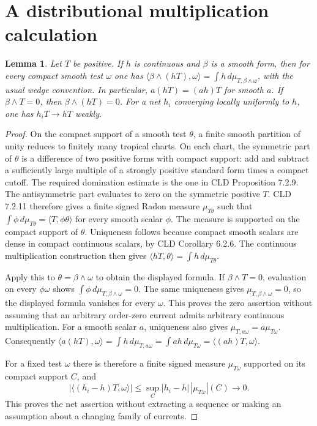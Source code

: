 \documentclass[11pt]{article}
\newtheorem{lemma}[theorem]{Lemma}
\begin{document}
\section{A distributional multiplication calculation}
\begin{lemma}\label{lem:coeff}
Let $T$ be positive. If $h$ is continuous and $\beta$ is a smooth form,
then for every compact smooth test $\omega$ one has
$\langle\beta\wedge(hT),\omega\rangle
=\int h\,d\mu_{T,\beta\wedge\omega}$, with the usual wedge convention.
In particular, $a(hT)=(ah)T$ for smooth $a$. If
$\beta\wedge T=0$, then $\beta\wedge(hT)=0$. For a net $h_i$ converging
locally uniformly to $h$, one has $h_iT\to hT$ weakly.
\end{lemma}
\begin{proof}
On the compact support of a smooth test $\theta$, a finite smooth
partition of unity reduces to finitely many tropical charts. On each
chart, the symmetric part of $\theta$ is a difference of two positive
forms with compact support: add and subtract a sufficiently large
multiple of a strongly positive standard form times a compact cutoff.
The required domination estimate is the one in CLD Proposition 7.2.9.
The antisymmetric part evaluates to zero on the symmetric positive $T$.
CLD 7.2.11 therefore gives a finite signed Radon measure $\mu_{T\theta}$
such that
$\int\phi\,d\mu_{T\theta}=\langle T,\phi\theta\rangle$
for every smooth scalar $\phi$. The measure is supported on the compact
support of $\theta$. Uniqueness follows because compact smooth scalars
are dense in compact continuous scalars, by CLD Corollary 6.2.6.
The continuous multiplication construction then gives
$\langle hT,\theta\rangle=\int h\,d\mu_{T\theta}$.

Apply this to $\theta=\beta\wedge\omega$ to obtain the displayed
formula. If $\beta\wedge T=0$, evaluation on every $\phi\omega$ shows
$\int\phi\,d\mu_{T,\beta\wedge\omega}=0$. The same uniqueness gives
$\mu_{T,\beta\wedge\omega}=0$, so the displayed formula vanishes for
every $\omega$. This proves the zero assertion without assuming that an
arbitrary order-zero current admits arbitrary continuous multiplication.
For a smooth scalar $a$, uniqueness also gives
$\mu_{T,a\omega}=a\mu_{T\omega}$. Consequently
$\langle a(hT),\omega\rangle=\int h\,d\mu_{T,a\omega}
=\int ah\,d\mu_{T\omega}=\langle(ah)T,\omega\rangle$.

For a fixed test $\omega$ there is therefore a finite signed measure
$\mu_{T\omega}$ supported on its compact support $C$, and
\[
 |\langle(h_i-h)T,\omega\rangle|
 \leq \sup_C|h_i-h|\,|\mu_{T\omega}|(C)\longrightarrow0.
\]
This proves the net assertion without extracting a sequence or making an
assumption about a changing family of currents.
\end{proof}
\end{document}
